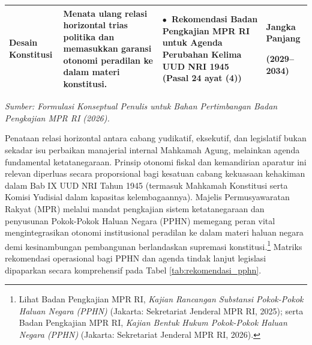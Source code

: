 \documentclass[12pt,a4paper,twocolumn]{article}
\begin{document}
\begin{table}[t]
\begin{tabularx}{\textwidth}{@{} >{\raggedright\arraybackslash}p{2.4cm} >{\raggedright\arraybackslash}X >{\raggedright\arraybackslash}p{4.6cm} >{\centering\arraybackslash}p{2.4cm} @{}}
        \addlinespace[4pt]
        \textbf{Desain Konstitusi}            & Menata ulang relasi horizontal trias politika dan memasukkan garansi otonomi peradilan ke dalam materi konstitusi.                                          & $\bullet$~Rekomendasi Badan Pengkajian MPR RI untuk Agenda Perubahan Kelima UUD NRI 1945 (Pasal 24 ayat (4))                                                                               & \textbf{Jangka Panjang}\par (2029--2034)            \\
        \bottomrule
    \end{tabularx}
    \vspace{4pt}
    \begin{minipage}{\textwidth}
        \footnotesize \textit{Sumber: Formulasi Konseptual Penulis untuk Bahan Pertimbangan Badan Pengkajian MPR RI (2026).}
    \end{minipage}
\end{table}

Penataan relasi horizontal antara cabang yudikatif, eksekutif, dan legislatif bukan sekadar isu perbaikan manajerial internal Mahkamah Agung, melainkan agenda fundamental ketatanegaraan. Prinsip otonomi fiskal dan kemandirian aparatur ini relevan diperluas secara proporsional bagi kesatuan cabang kekuasaan kehakiman dalam Bab IX UUD NRI Tahun 1945 (termasuk Mahkamah Konstitusi serta Komisi Yudisial dalam kapasitas kelembagaannya). Majelis Permusyawaratan Rakyat (MPR) melalui mandat pengkajian sistem ketatanegaraan dan penyusunan Pokok-Pokok Haluan Negara (PPHN) memegang peran vital mengintegrasikan otonomi institusional peradilan ke dalam materi haluan negara demi kesinambungan pembangunan berlandaskan supremasi konstitusi.\footnote{Lihat Badan Pengkajian MPR RI, \textit{Kajian Rancangan Substansi Pokok-Pokok Haluan Negara (PPHN)} (Jakarta: Sekretariat Jenderal MPR RI, 2025); serta Badan Pengkajian MPR RI, \textit{Kajian Bentuk Hukum Pokok-Pokok Haluan Negara (PPHN)} (Jakarta: Sekretariat Jenderal MPR RI, 2026).} Matriks rekomendasi operasional bagi PPHN dan agenda tindak lanjut legislasi dipaparkan secara komprehensif pada Tabel \ref{tab:rekomendasi_pphn}.
\end{document}
